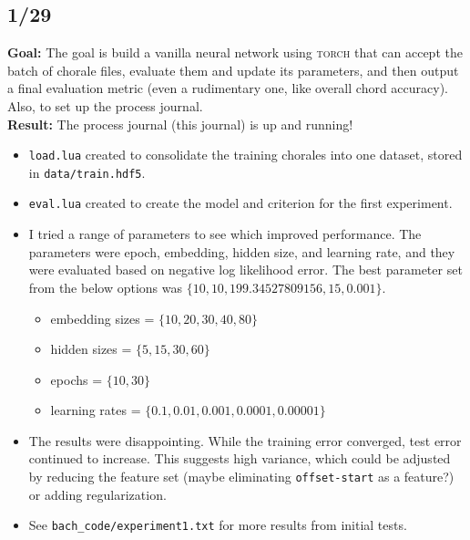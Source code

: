 \documentclass[12pt]{article}
\begin{document}
\subsection{1/29}
\textbf{Goal:} The goal is build a vanilla neural network using \textsc{torch} that can accept the batch of chorale files, evaluate them and update its parameters, and then output a final evaluation metric (even a rudimentary one, like overall chord accuracy). Also, to set up the process journal. \\
\textbf{Result: } The process journal (this journal) is up and running!
\begin{itemize}
\item \texttt{load.lua} created to consolidate the training chorales into one dataset, stored in \texttt{data/train.hdf5}.
\item \texttt{eval.lua} created to create the model and criterion for the first experiment. 
\item I tried a range of parameters to see which improved performance. The parameters were epoch, embedding, hidden size, and learning rate, and they were evaluated based on negative log likelihood error. The best parameter set from the below options was $\{10, 10, 199.34527809156, 15, 0.001\}$.
\begin{itemize}
\item embedding sizes = $\{10, 20, 30, 40, 80\}$
\item hidden sizes = $\{5, 15, 30, 60\}$
\item epochs = $\{10, 30\}$
\item learning rates = $\{0.1, 0.01, 0.001, 0.0001, 0.00001\}$
\end{itemize}
\item The results were disappointing. While the training error converged, test error continued to increase. This suggests high variance, which could be adjusted by reducing the feature set (maybe eliminating \texttt{offset-start} as a feature?) or adding regularization.
\item See \texttt{bach\_code/experiment1.txt} for more results from initial tests.
\end{itemize}
\end{document}
